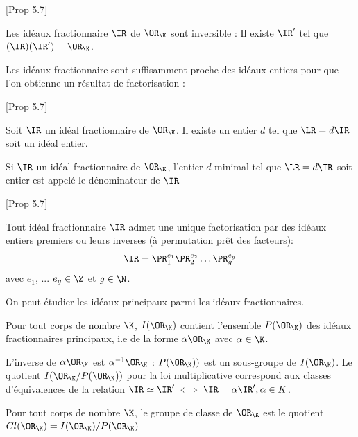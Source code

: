 \begin{Prop}\cite{Cox}[Prop 5.7]
	
	Les idéaux fractionnaire $\IR$ de $\OR_{\K}$ sont inversible :
	Il existe $\IR'$ tel que $(\IR)(\IR') = \OR_{\K}$.
\end{Prop}

Les idéaux fractionnaire sont suffisamment proche des idéaux entiers pour que l'on obtienne un résultat de factorisation :

\begin{Prop}\cite{Cox}[Prop 5.7]
	
	Soit $\IR$ un idéal fractionnaire de $\OR_{\K}$. Il existe un entier $d$ tel que $\LR = d\IR$ soit un idéal entier. 
\end{Prop}

\begin{Def}
	Si $\IR$ un idéal fractionnaire de $\OR_{\K}$, l'entier $d$ minimal tel que $\LR = d\IR$ soit entier est appelé le dénominateur de $\IR$
\end{Def}

\begin{Prop}\cite{Cox}[Prop 5.7]
	
	Tout idéal fractionnaire $\IR$ admet une unique factorisation par des idéaux entiers premiers ou leurs inverses (à permutation prêt des facteurs):
	\begin{equation*}
		\IR = \PR_{1}^{e_{1}}\PR_{2}^{e_{2}}\ldots\PR_{g}^{e_{g}}
	\end{equation*}
	avec $e_{1}$, ... $e_{g}\in\Z$ et $g\in\N$.
\end{Prop}

On peut étudier les idéaux principaux parmi les idéaux fractionnaires.

\begin{Def}
	Pour tout corps de nombre $\K$, $I(\OR_{\K})$ contient l'ensemble $P(\OR_{\K})$ des idéaux fractionnaires principaux, i.e de la forme $\alpha\OR_{\K}$ avec $\alpha\in\K$. 
\end{Def} 

\begin{Rem}
	L'inverse de $\alpha\OR_{\K}$ est $\alpha^{-1}\OR_{\K}$ : $P(\OR_{\K}))$ est un sous-groupe de $I(\OR_{\K})$. Le quotient $I(\OR_{\K}/P(\OR_{\K}))$ pour la loi multiplicative correspond aux classes d'équivalences de la relation $\IR\simeq\IR'\iff\IR = \alpha\IR',\alpha\in\\K$.
\end{Rem}

\begin{Def}
	Pour tout corps de nombre $\K$, le groupe de classe de $\OR_{\K}$ est le quotient $Cl(\OR_{\K}) =  I(\OR_{\K})/P(\OR_{\K})$
\end{Def}

